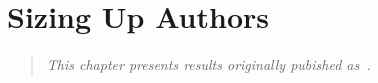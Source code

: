 \chapter{Sizing Up Authors}
\label{ch:contrib}

\begin{quote}
\textit{This chapter presents results originally pubished
as~\cite{AuthorContrib2008}.}
\end{quote}









